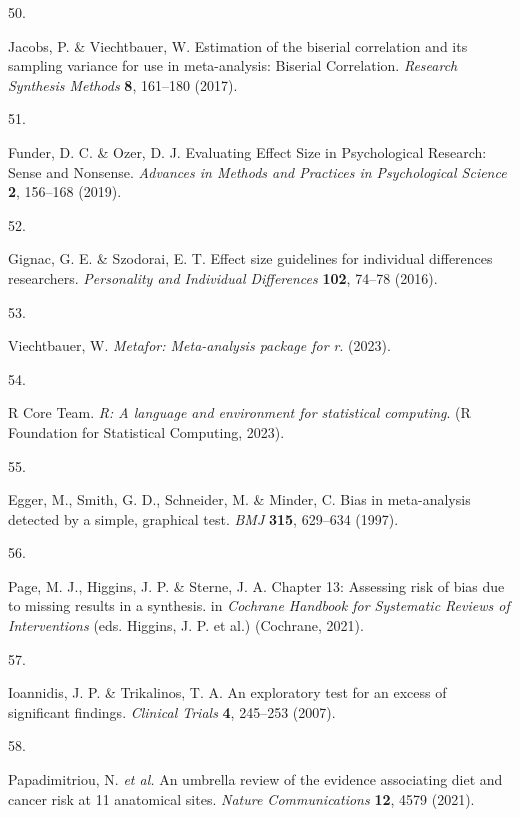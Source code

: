 \documentclass[
  english,
  man]{apa6}
\newlength{\cslhangindent}
\newlength{\csllabelwidth}
\newenvironment{CSLReferences}[2] %
 {%
  \setlength{\parindent}{0pt}
  \ifodd #1 \everypar{\setlength{\hangindent}{\cslhangindent}}\ignorespaces\fi
  \ifnum #2 > 0
  \setlength{\parskip}{#2\baselineskip}
  \fi
 }%
 {}
\newcommand{\CSLLeftMargin}[1]{\parbox[t]{\csllabelwidth}{#1}}
\newcommand{\CSLRightInline}[1]{\parbox[t]{\linewidth - \csllabelwidth}{#1}\break}
\begin{document}
\begin{CSLReferences}{0}{0}
\leavevmode{}%
\CSLLeftMargin{50. }
\CSLRightInline{Jacobs, P. \& Viechtbauer, W. Estimation of the biserial correlation and its sampling variance for use in meta-analysis: {Biserial Correlation}. \emph{Research Synthesis Methods} \textbf{8}, 161--180 (2017).}

\leavevmode{}%
\CSLLeftMargin{51. }
\CSLRightInline{Funder, D. C. \& Ozer, D. J. Evaluating {Effect Size} in {Psychological Research}: {Sense} and {Nonsense}. \emph{Advances in Methods and Practices in Psychological Science} \textbf{2}, 156--168 (2019).}

\leavevmode{}%
\CSLLeftMargin{52. }
\CSLRightInline{Gignac, G. E. \& Szodorai, E. T. Effect size guidelines for individual differences researchers. \emph{Personality and Individual Differences} \textbf{102}, 74--78 (2016).}

\leavevmode{}%
\CSLLeftMargin{53. }
\CSLRightInline{Viechtbauer, W. \emph{Metafor: Meta-analysis package for r}. (2023).}

\leavevmode{}%
\CSLLeftMargin{54. }
\CSLRightInline{R Core Team. \emph{R: A language and environment for statistical computing}. (R Foundation for Statistical Computing, 2023).}

\leavevmode{}%
\CSLLeftMargin{55. }
\CSLRightInline{Egger, M., Smith, G. D., Schneider, M. \& Minder, C. Bias in meta-analysis detected by a simple, graphical test. \emph{BMJ} \textbf{315}, 629--634 (1997).}

\leavevmode{}%
\CSLLeftMargin{56. }
\CSLRightInline{Page, M. J., Higgins, J. P. \& Sterne, J. A. Chapter 13: {Assessing} risk of bias due to missing results in a synthesis. in \emph{Cochrane {Handbook} for {Systematic Reviews} of {Interventions}} (eds. Higgins, J. P. et al.) ({Cochrane}, 2021).}

\leavevmode{}%
\CSLLeftMargin{57. }
\CSLRightInline{Ioannidis, J. P. \& Trikalinos, T. A. An exploratory test for an excess of significant findings. \emph{Clinical Trials} \textbf{4}, 245--253 (2007).}

\leavevmode{}%
\CSLLeftMargin{58. }
\CSLRightInline{Papadimitriou, N. \emph{et al.} An umbrella review of the evidence associating diet and cancer risk at 11 anatomical sites. \emph{Nature Communications} \textbf{12}, 4579 (2021).}

\end{CSLReferences}

\newpage
\end{document}
